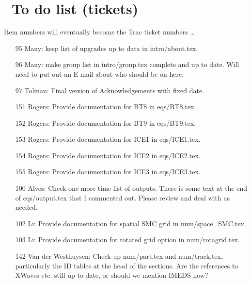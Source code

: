 \pagestyle{myheadings} \setcounter{page}{1} \setcounter{footnote}{0}

\section{~To do list (tickets)} \label{app:to_do}
\newcounters 
\vssub

\noindent
Item numbers will eventually become the Trac ticket numbers \ldots

\begin{itemize}

\item[95] Many: keep list of upgrades up to data in intro/about.tex.

\item[96] Many: make group list in intro/group.tex complete and up to
  date. Will need to put out an E-mail about who should be on here.

\item[97] Tolman: Final version of Acknowledgements with fixed date.

\item[151] Rogers: Provide documentation for BT8 in {\file eqs/BT8.tex}.

\item[152] Rogers: Provide documentation for BT9 in {\file eqs/BT9.tex}.

\item[153] Rogers: Provide documentation for ICE1 in {\file eqs/ICE1.tex}.

\item[154] Rogers: Provide documentation for ICE2 in {\file eqs/ICE2.tex}.

\item[155] Rogers: Provide documentation for ICE3 in {\file eqs/ICE3.tex}.

\item[100] Alves: Check one more time list of outputs. There is some text at
  the end of eqs/output.tex that I commented out. Please review and deal with
  as needed.

\item[102] Li: Provide documentation for spatial SMC grid in num/space\_SMC.tex.

\item[103] Li: Provide documentation for rotated grid option in
  num/rotagrid.tex.

\item[142] Van der Westhuysen: Check up num/part.tex and num/track.tex,
  particularly the ID tables at the head of the sections. Are the references to
  XWaves etc. still up to date, or should we mention IMEDS now?


\end{itemize}
